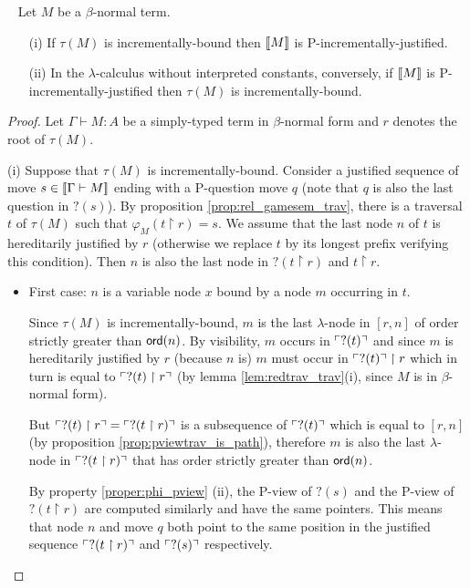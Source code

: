 \begin{prop} \
\label{prop:incrbound_imp_incrjustified} Let $M$ be a $\beta$-normal
term.
\begin{enumerate}
\item[(i)] If $\tau(M)$ is incrementally-bound then ${[\![ M ]\!]}$ is P-incrementally-justified.
\item[(ii)] In the $\lambda$-calculus without interpreted constants, conversely, if ${[\![ M ]\!]}$ is P-incrementally-justified then
$\tau(M)$ is incrementally-bound.
\end{enumerate}
\end{prop}

\begin{proof}
Let $\Gamma \vdash M : A$ be a simply-typed term in $\beta$-normal
form and $r$ denotes the root of $\tau(M)$.

\noindent (i) Suppose that $\tau(M)$ is incrementally-bound.
Consider a justified sequence of move $s \in {[\![\Gamma \vdash M ]\!]}$
ending with a P-question move $q$ (note that $q$ is also the last
question in $?(s)$). By proposition \ref{prop:rel_gamesem_trav},
there is a traversal $t$ of $\tau(M)$ such that $\varphi_{M}(t
\upharpoonright r) = s$. We assume that the last node $n$ of $t$ is
hereditarily justified by $r$ (otherwise we replace $t$ by its
longest prefix verifying this condition). Then $n$ is also the last
node in $?(t \upharpoonright r)$ and $t \upharpoonright r$.
\begin{itemize}
\item First case: $n$ is a variable node $x$ bound by a node $m$ occurring in $t$.

Since $\tau(M)$ is incrementally-bound,
$m$ is the last $\lambda$-node in $[r,n]$ of order strictly greater
than ${\sf ord}(n)$. By visibility, $m$ occurs in $\ulcorner ?(t) \urcorner$ and
since $m$ is hereditarily justified by $r$ (because $n$ is) 
$m$ must occur in $\ulcorner ?(t) \urcorner \upharpoonright r$ which in turn
is equal to $\ulcorner ?(t) \upharpoonright r \urcorner$ (by lemma \ref{lem:redtrav_trav}(i), since $M$ is in $\beta$-normal form).

But $\ulcorner ?(t) \upharpoonright r \urcorner = \ulcorner ?(t \upharpoonright r) \urcorner$ is a subsequence of
$\ulcorner ?(t) \urcorner$ which is equal to $[r,n]$ (by proposition \ref{prop:pviewtrav_is_path}), therefore $m$ is also the last $\lambda$-node in
$\ulcorner ?(t \upharpoonright  r) \urcorner$ that has order strictly greater
than ${\sf ord}(n)$.

By property \ref{proper:phi_pview} (ii), the P-view of $?(s)$ and
the P-view of $?(t \upharpoonright r)$ are computed similarly and
have the same pointers. This means that node $n$ and  move $q$ both
point to the same position in the justified sequence
$\ulcorner ?(t\upharpoonright r) \urcorner$ and $\ulcorner ?(s) \urcorner$ respectively.


\end{itemize}
\end{proof}
